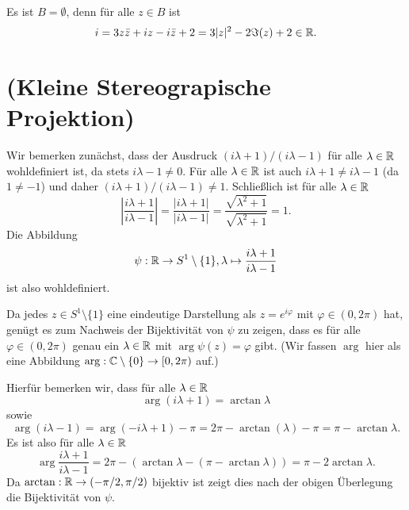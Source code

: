 \documentclass[a4paper,10pt]{article}
\begin{document}
\begin{center}
\end{center}





\subsection{}
Es ist $B = \emptyset$, denn für alle $z \in B$ ist
\[
 i = 3z\bar{z}+iz-i\bar{z}+2 = 3|z|^2 -2\Im(z) +2 \in \mathbb{R}.
\]





\section{(Kleine Stereograpische Projektion)}
Wir bemerken zunächst, dass der Ausdruck $(i\lambda+1)/(i\lambda-1)$ für alle $\lambda \in \mathbb{R}$ wohldefiniert ist, da stets $i\lambda-1 \neq 0$. Für alle $\lambda \in \mathbb{R}$ ist auch $i\lambda+1 \neq i\lambda-1$ (da $1 \neq -1$) und daher $(i\lambda+1)/(i\lambda-1) \neq 1$. Schließlich ist für alle $\lambda \in \mathbb{R}$
\[
 \left| \frac{i\lambda+1}{i\lambda-1} \right|
 = \frac{|i\lambda+1|}{|i\lambda-1|}
 = \frac{\sqrt{\lambda^2+1}}{\sqrt{\lambda^2+1}}
 = 1.
\]
Die Abbildung
\[
 \psi : \mathbb{R} \to S^1 \setminus \{1\}, \lambda \mapsto \frac{i\lambda+1}{i\lambda-1}
\]
ist also wohldefiniert.

Da jedes $z \in S^1 \setminus \{1\}$ eine eindeutige Darstellung als $z = e^{i\varphi}$ mit $\varphi \in (0,2\pi)$ hat, genügt es zum Nachweis der Bijektivität von $\psi$ zu zeigen, dass es für alle $\varphi \in (0,2\pi)$ genau ein $\lambda \in \mathbb{R}$ mit $\arg \psi(z) = \varphi$ gibt. (Wir fassen $\arg$ hier als eine Abbildung $\arg : \mathbb{C} \setminus \{0\} \to [0,2\pi)$ auf.)

Hierfür bemerken wir, dass für alle $\lambda \in \mathbb{R}$
\[
 \arg (i \lambda + 1) = \arctan \lambda
\]
sowie
\[
 \arg (i \lambda - 1) = \arg(-i \lambda + 1) - \pi = 2 \pi - \arctan (\lambda) - \pi = \pi - \arctan \lambda.
\]
Es ist also für alle $\lambda \in \mathbb{R}$
\[
 \arg \frac{i\lambda+1}{i\lambda-1}
 = 2\pi - \left( \arctan \lambda - (\pi - \arctan \lambda) \right)
 = \pi - 2\arctan \lambda.
\]
Da $\arctan : \mathbb{R} \to (-\pi/2,\pi/2)$ bijektiv ist zeigt dies nach der obigen Überlegung die Bijektivität von $\psi$.
\end{document}
